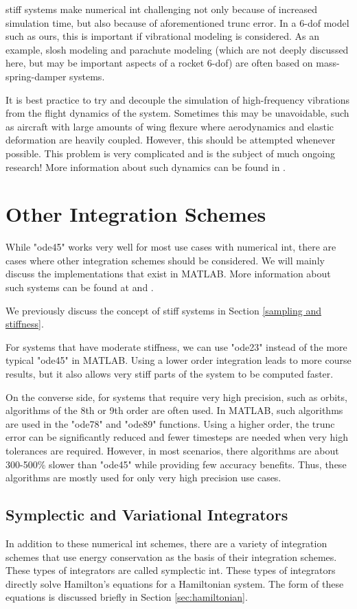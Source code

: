 \documentclass[12pt]{report}
\begin{document}
\Gls{stiff} systems make \gls{numerical int} challenging not only because of increased simulation time, but also because of aforementioned \gls{trunc error}. In a 6-\gls{dof} model such as ours, this is important if vibrational modeling is considered. As an example, slosh modeling and parachute modeling (which are not deeply discussed here, but may be important aspects of a rocket 6-\gls{dof}) are often based on mass-spring-damper systems.

It is best practice to try and decouple the simulation of high-frequency vibrations from the flight dynamics of the system. Sometimes this may be unavoidable, such as aircraft with large amounts of wing flexure where aerodynamics and elastic deformation are heavily coupled. However, this should be attempted whenever possible. This problem is very complicated and is the subject of much ongoing research! More information about such dynamics can be found in \cite{shyy_recent_2010}.
\section{Other Integration Schemes}
While "ode45" works very well for most use cases with \gls{numerical int}, there are cases where other integration schemes should be considered. We will mainly discuss the implementations that exist in MATLAB. More information about such systems can be found at \cite{mathworks_choose_2024} and \cite{mathworks_summary_2024}.

We previously discuss the concept of \gls{stiff} systems in Section \ref{sampling and stiffness}. 

For systems that have moderate stiffness, we can use "ode23" instead of the more typical "ode45" in MATLAB. Using a lower order integration leads to more course results, but it also allows very \gls{stiff} parts of the system to be computed faster.

On the converse side, for systems that require very high precision, such as orbits, algorithms of the 8th or 9th order are often used. In MATLAB, such algorithms are used in the "ode78" and "ode89" functions. Using a higher order, the \gls{trunc error} can be significantly reduced and fewer timesteps are needed when very high tolerances are required. However, in most scenarios, there algorithms are about 300-500\% slower than "ode45" while providing few accuracy benefits. Thus, these algorithms are mostly used for only very high precision use cases.

\subsection{Symplectic and Variational Integrators}
In addition to these \gls{numerical int} schemes, there are a variety of integration schemes that use energy conservation as the basis of their integration schemes. These types of integrators are called \gls{symplectic int}. These types of integrators directly solve Hamilton's equations for a Hamiltonian system. The form of these equations is discussed briefly in Section \ref{sec:hamiltonian}.
\end{document}
